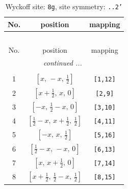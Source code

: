 \documentclass[fleqn,8pt]{jsarticle}
\begin{document}
\renewcommand{\arraystretch}{1.2}
\begin{longtable}{ccc}
\caption{Wyckoff site: {\tt 8g}, site symmetry: {\tt ..2'}}
 \\
 \hline \hline
No. & position & mapping \\ \hline \endfirsthead

\multicolumn{2}{l}{\tablename\ \thetable{}} \\
 \hline \hline
No. & position & mapping \\ \hline \endhead

 \hline \hline
\multicolumn{2}{r}{\footnotesize\it continued ...} \\ \endfoot

 \hline \hline
\multicolumn{2}{r}{} \\ \endlastfoot

1 & $\left[ x,\, - x,\, \frac{1}{2} \right]$ & {\tt [1,12]} \\ \hline
2 & $\left[ x + \frac{1}{2},\, x,\, 0 \right]$ & {\tt [2,9]} \\ \hline
3 & $\left[ - x,\, \frac{1}{2} - x,\, 0 \right]$ & {\tt [3,10]} \\ \hline
4 & $\left[ \frac{1}{2} - x,\, x + \frac{1}{2},\, \frac{1}{2} \right]$ & {\tt [4,11]} \\ \hline
5 & $\left[ - x,\, x,\, \frac{1}{2} \right]$ & {\tt [5,16]} \\ \hline
6 & $\left[ \frac{1}{2} - x,\, - x,\, 0 \right]$ & {\tt [6,13]} \\ \hline
7 & $\left[ x,\, x + \frac{1}{2},\, 0 \right]$ & {\tt [7,14]} \\ \hline
8 & $\left[ x + \frac{1}{2},\, \frac{1}{2} - x,\, \frac{1}{2} \right]$ & {\tt [8,15]} \\
\end{longtable}
\renewcommand{\arraystretch}{1.2}
\end{document}
